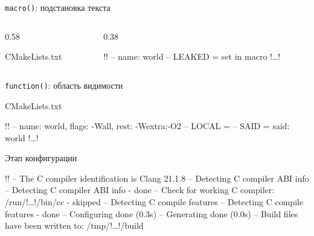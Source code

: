\documentclass[compress, 8pt, aspectratio=169]{beamer}
\begin{document}
\begin{frame}[fragile]{\texttt{macro()}: подстановка текста}

  \begin{columns}[T]

    \begin{column}{0.58\textwidth}

        {CMakeLists.txt}

    \end{column}

    \begin{column}{0.38\textwidth}

      \begin{terminalwindow}
!!
-- name: world
-- LEAKED = set in macro
!\dots!
      \end{terminalwindow}

    \end{column}

  \end{columns}

\end{frame}

\begin{frame}[fragile]{\texttt{function()}: область видимости}

    {CMakeLists.txt}

  \bigbreak

  \begin{terminalwindow}
!!
-- name: world, flags: -Wall, rest: -Wextra;-O2
-- LOCAL  = 
-- SAID   = said: world
!\dots!
  \end{terminalwindow}

\end{frame}

\begin{frame}[fragile]{Этап конфигурации}

  \begin{terminalwindow}
!!
-- The C compiler identification is Clang 21.1.8
-- Detecting C compiler ABI info
-- Detecting C compiler ABI info - done
-- Check for working C compiler: /run/!\dots!/bin/cc - skipped
-- Detecting C compile features
-- Detecting C compile features - done
-- Configuring done (0.3s)
-- Generating done (0.0s)
-- Build files have been written to: /tmp/!\dots!/build
  \end{terminalwindow}

\end{frame}
\end{document}

